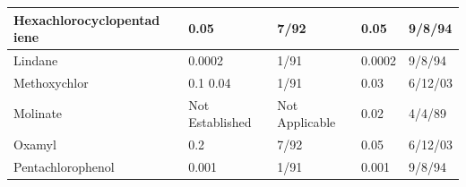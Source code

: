 \begin{table}[]
\begin{tabular}{|l|l|l|l|l|}
Hexachlorocyclopentad   iene                                               & 0.05                                                               & 7/92                                                                                                              & 0.05                                                                                         & 9/8/94                                           \\ \hline
Lindane                                                                    & 0.0002                                                             & 1/91                                                                                                              & 0.0002                                                                                       & 9/8/94                                           \\ \hline
Methoxychlor                                                               & 0.1   0.04                                                         & 1/91                                                                                                              & 0.03                                                                                         & 6/12/03                                          \\ \hline
Molinate                                                                   & Not   Established                                                  & Not   Applicable                                                                                                  & 0.02                                                                                         & 4/4/89                                           \\ \hline
Oxamyl                                                                     & 0.2                                                                & 7/92                                                                                                              & 0.05                                                                                         & 6/12/03                                          \\ \hline
Pentachlorophenol                                                          & 0.001                                                              & 1/91                                                                                                              & 0.001                                                                                        & 9/8/94                                           \\ \hline

\end{tabular}
\end{table}
